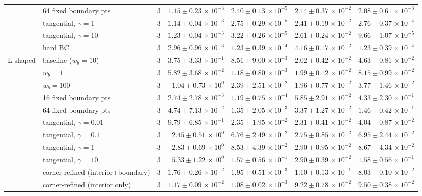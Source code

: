 \begin{tabular}{llrrrrr}
 & 64 fixed boundary pts & 3 & $1.15\pm0.23\,\times\!10^{-3}$ & $2.40\pm0.13\,\times\!10^{-5}$ & $2.14\pm0.37\,\times\!10^{-2}$ & $2.08\pm0.61\,\times\!10^{-3}$ \\
 & tangential, $\gamma{=}1$ & 3 & $1.14\pm0.04\,\times\!10^{-3}$ & $2.75\pm0.29\,\times\!10^{-5}$ & $2.41\pm0.19\,\times\!10^{-2}$ & $2.76\pm0.37\,\times\!10^{-4}$ \\
 & tangential, $\gamma{=}10$ & 3 & $1.23\pm0.04\,\times\!10^{-3}$ & $3.22\pm0.26\,\times\!10^{-5}$ & $2.61\pm0.24\,\times\!10^{-2}$ & $9.66\pm1.07\,\times\!10^{-5}$ \\
 & hard BC & 3 & $2.96\pm0.96\,\times\!10^{-3}$ & $1.23\pm0.39\,\times\!10^{-4}$ & $4.16\pm0.17\,\times\!10^{-2}$ & $1.23\pm0.39\,\times\!10^{-4}$ \\
\midrule
L-shaped & baseline ($w_b{=}10$) & 3 & $3.75\pm3.33\,\times\!10^{-1}$ & $8.51\pm9.00\,\times\!10^{-3}$ & $2.02\pm0.42\,\times\!10^{-2}$ & $4.63\pm0.81\,\times\!10^{-2}$ \\
 & $w_b{=}1$ & 3 & $5.82\pm3.68\,\times\!10^{-2}$ & $1.18\pm0.80\,\times\!10^{-3}$ & $1.99\pm0.12\,\times\!10^{-2}$ & $8.15\pm0.99\,\times\!10^{-2}$ \\
 & $w_b{=}100$ & 3 & $1.04\pm0.73\,\times\!10^{0}$ & $2.39\pm2.51\,\times\!10^{-2}$ & $1.96\pm0.77\,\times\!10^{-2}$ & $3.77\pm1.46\,\times\!10^{-2}$ \\
 & 16 fixed boundary pts & 3 & $2.74\pm2.78\,\times\!10^{-3}$ & $1.19\pm0.75\,\times\!10^{-4}$ & $5.85\pm2.91\,\times\!10^{-2}$ & $4.33\pm2.30\,\times\!10^{-1}$ \\
 & 64 fixed boundary pts & 3 & $4.74\pm7.13\,\times\!10^{-2}$ & $1.35\pm2.05\,\times\!10^{-3}$ & $3.37\pm1.27\,\times\!10^{-2}$ & $1.46\pm0.42\,\times\!10^{-1}$ \\
 & tangential, $\gamma{=}0.01$ & 3 & $9.79\pm6.85\,\times\!10^{-1}$ & $2.35\pm1.95\,\times\!10^{-2}$ & $2.31\pm0.41\,\times\!10^{-2}$ & $4.04\pm0.87\,\times\!10^{-2}$ \\
 & tangential, $\gamma{=}0.1$ & 3 & $2.45\pm0.51\,\times\!10^{0}$ & $6.76\pm2.49\,\times\!10^{-2}$ & $2.75\pm0.85\,\times\!10^{-2}$ & $6.95\pm2.44\,\times\!10^{-2}$ \\
 & tangential, $\gamma{=}1$ & 3 & $2.83\pm0.69\,\times\!10^{0}$ & $8.53\pm4.39\,\times\!10^{-2}$ & $2.90\pm0.95\,\times\!10^{-2}$ & $8.67\pm4.34\,\times\!10^{-2}$ \\
 & tangential, $\gamma{=}10$ & 3 & $5.33\pm1.22\,\times\!10^{0}$ & $1.57\pm0.56\,\times\!10^{-1}$ & $2.90\pm0.39\,\times\!10^{-2}$ & $1.58\pm0.56\,\times\!10^{-1}$ \\
 & corner-refined (interior+boundary) & 3 & $1.76\pm0.26\,\times\!10^{-2}$ & $1.95\pm0.51\,\times\!10^{-3}$ & $1.10\pm0.13\,\times\!10^{-1}$ & $8.03\pm0.10\,\times\!10^{-2}$ \\
 & corner-refined (interior only) & 3 & $1.17\pm0.09\,\times\!10^{-2}$ & $1.08\pm0.02\,\times\!10^{-3}$ & $9.22\pm0.78\,\times\!10^{-2}$ & $9.50\pm0.38\,\times\!10^{-2}$ \\
\bottomrule
\end{tabular}
